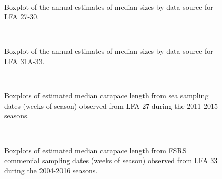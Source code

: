 \documentclass[11pt]{article}
\newcommand{\e}{/backup/bio_data/bio.lobster/figures/} %
\begin{document}
\begin{figure}
        \centering
         \\
                     \caption{Boxplot of the annual estimates of median sizes by data source for LFA 27-30.}
        \end{figure}


\begin{figure}
        \centering
         \\
                     \caption{Boxplot of the annual estimates of median sizes by data source for LFA 31A-33.}
        \end{figure}

\begin{figure}
        \centering
         \\
                     \caption{Boxplots of estimated median carapace length from sea sampling dates (weeks of season) observed from LFA 27 during the 2011-2015 seasons. }
        \end{figure}

\begin{figure}
        \centering
         \\
                     \caption{Boxplots of estimated median carapace length from FSRS commercial sampling dates (weeks of season) observed from LFA 33 during the 2004-2016 seasons. }
        \end{figure}



%
\end{document}
